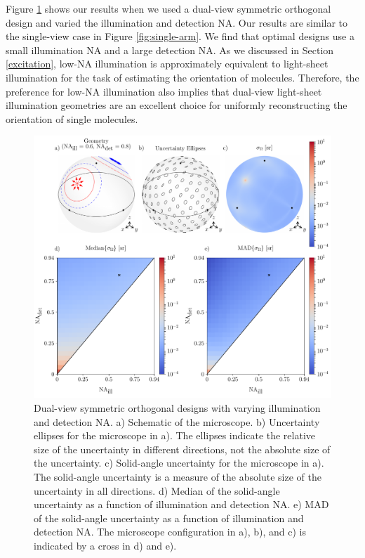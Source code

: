 \documentclass[10pt]{article}
\begin{document}
Figure \ref{fig:double-arm} shows our results when we used a dual-view symmetric
orthogonal design and varied the illumination and detection NA. Our results are
similar to the single-view case in Figure \ref{fig:single-arm}. We find that
optimal designs use a small illumination NA and a large detection NA. As we
discussed in Section \ref{excitation}, low-NA illumination is
approximately equivalent to light-sheet illumination for the task of estimating
the orientation of molecules. Therefore, the preference for low-NA
illumination also implies that dual-view light-sheet illumination geometries are
an excellent choice for uniformly reconstructing the orientation of single
molecules.

\begin{figure}[htbp]
\centering\includegraphics[width=\textwidth]{double-arm}
\caption{Dual-view symmetric orthogonal designs with varying
  illumination and detection NA. a) Schematic of the microscope. b) Uncertainty
  ellipses for the microscope in a). The ellipses indicate the relative size of
  the uncertainty in different directions, not the absolute size of the
  uncertainty. c) Solid-angle uncertainty for the microscope in a). The
  solid-angle uncertainty is a measure of the absolute size of the uncertainty
  in all directions. d) Median of the solid-angle uncertainty as a function of
  illumination and detection NA. e) MAD of the solid-angle uncertainty
  as a function of illumination and detection NA. The microscope configuration
  in a), b), and c) is indicated by a cross in d) and e).}
\label{fig:double-arm}
\end{figure}
\end{document}
